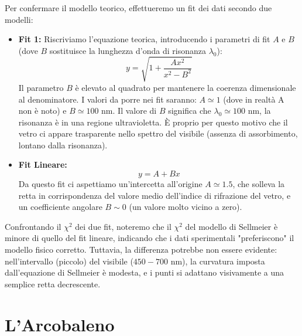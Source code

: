 \documentclass[openany,a4paper,12pt]{book}
\begin{document}
Per confermare il modello teorico, effettueremo un fit dei dati secondo due modelli:
\begin{itemize}
    \item \textbf{Fit 1:} Riscriviamo l'equazione teorica, introducendo i parametri di fit $A$ e $B$ (dove $B$ sostituisce la lunghezza d'onda di risonanza $\lambda_0$):
    \begin{equation}
        y = \sqrt{1 + \frac{A x^2}{x^2 - B^2}}
    \end{equation}
    Il parametro $B$ è elevato al quadrato per mantenere la coerenza dimensionale al denominatore. 
    I valori da porre nei fit saranno: $A \simeq 1$ (dove in realtà A non è noto) e $B \simeq 100 \text{ nm}$. Il valore di $B$ significa che $\lambda_0 \simeq 100 \text{ nm}$, la risonanza è in una regione ultravioletta. È proprio per questo motivo che il vetro ci appare trasparente nello spettro del visibile (assenza di assorbimento, lontano dalla risonanza).
    
    \item \textbf{Fit Lineare:}
    \begin{equation}
        y = A + Bx
    \end{equation}
    Da questo fit ci aspettiamo un'intercetta all'origine $A \simeq 1.5$, che solleva la retta in corrispondenza del valore medio dell'indice di rifrazione del vetro, e un coefficiente angolare $B \sim 0$ (un valore molto vicino a zero). 
\end{itemize}

\begin{nota}[title=Confronto tra i modelli]
Confrontando il $\chi^2$ dei due fit, noteremo che il $\chi^2$ del modello di Sellmeier è minore di quello del fit lineare, indicando che i dati sperimentali "preferiscono" il modello fisico corretto. Tuttavia, la differenza potrebbe non essere evidente: nell'intervallo (piccolo) del visibile ($450-700 \text{ nm}$), la curvatura imposta dall'equazione di Sellmeier è modesta, e i punti si adattano visivamente a una semplice retta decrescente.
\end{nota}



\section{L'Arcobaleno} 
\end{document}
